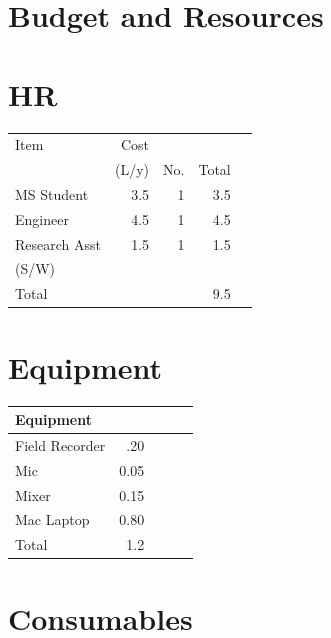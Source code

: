 \documentclass{tufte-handout}
\begin{document}
\section{Budget and Resources }
\label{sec-1}
\section{HR}
\label{sec-1-1}


\begin{center}
\begin{tabular}{lrrrl}
\hline
 Item           &   Cost  &       &         &     \\
                &  (L/y)  &  No.  &  Total  &     \\
\hline
 MS Student     &    3.5  &    1  &    3.5  &     \\
\hline
 Engineer       &    4.5  &    1  &    4.5  &     \\
\hline
 Research Asst  &    1.5  &    1  &    1.5  &     \\
 (S/W)          &         &       &         &     \\
\hline
 Total          &         &       &    9.5  &     \\
\hline
\end{tabular}
\end{center}
\section{Equipment}
\label{sec-1-2}



\begin{center}
\begin{tabular}{lrlll}
\hline
 Equipment       &        &     &     &     \\
\hline
 Field Recorder  &   .20  &     &     &     \\
\hline
 Mic             &  0.05  &     &     &     \\
\hline
 Mixer           &  0.15  &     &     &     \\
\hline
 Mac Laptop      &  0.80  &     &     &     \\
\hline
 Total           &   1.2  &     &     &     \\
\hline
\end{tabular}
\end{center}
\section{Consumables}
\label{sec-1-3}
\end{document}
